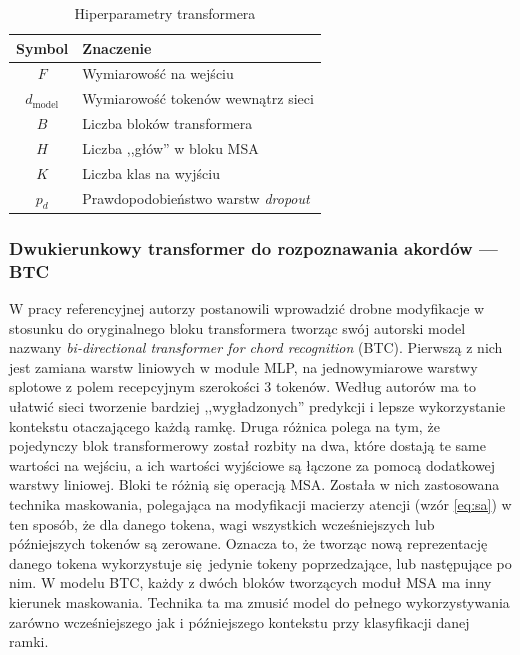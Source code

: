 \begin{table}
    \centering
    \caption{Hiperparametry transformera}
    \label{tab:transformer_params}
    \begin{tabular}{|c|l|} \hline
        Symbol & Znaczenie \\ \hline
        $F$ & Wymiarowość na wejściu \\
        $d_{\mathrm{model}}$ & Wymiarowość tokenów wewnątrz sieci \\
        $B$ & Liczba bloków transformera \\
        $H$ & Liczba ,,głów'' w bloku MSA \\
        $K$ & Liczba klas na wyjściu \\
        $p_d$ & Prawdopodobieństwo warstw \emph{dropout} \\ \hline
    \end{tabular}
\end{table}

\subsubsection{Dwukierunkowy transformer do rozpoznawania akordów --- BTC}

W pracy referencyjnej \cite{park_bi-directional_2019} autorzy postanowili wprowadzić drobne
modyfikacje w stosunku do oryginalnego bloku transformera tworząc swój autorski model nazwany
\emph{bi-directional transformer for chord recognition} (BTC). Pierwszą z nich jest zamiana warstw
liniowych w module MLP, na jednowymiarowe warstwy splotowe z polem recepcyjnym szerokości 3 tokenów.
Według autorów ma to ułatwić sieci tworzenie bardziej ,,wygładzonych'' predykcji i lepsze
wykorzystanie kontekstu otaczającego każdą ramkę. Druga różnica polega na tym, że pojedynczy blok
transformerowy został rozbity na dwa, które dostają te same wartości na wejściu, a ich wartości
wyjściowe są łączone za pomocą dodatkowej warstwy liniowej. Bloki te różnią się operacją MSA.
Została w nich zastosowana technika maskowania, polegająca na modyfikacji macierzy atencji (wzór
\ref{eq:sa}) w ten sposób, że dla danego tokena, wagi wszystkich wcześniejszych lub późniejszych
tokenów są zerowane. Oznacza to, że tworząc nową reprezentację danego tokena wykorzystuje
się jedynie tokeny poprzedzające, lub następujące po nim. W modelu BTC, każdy z dwóch bloków
tworzących moduł MSA ma inny kierunek maskowania. Technika ta ma zmusić model do pełnego
wykorzystywania zarówno wcześniejszego jak i późniejszego kontekstu przy klasyfikacji danej ramki.

